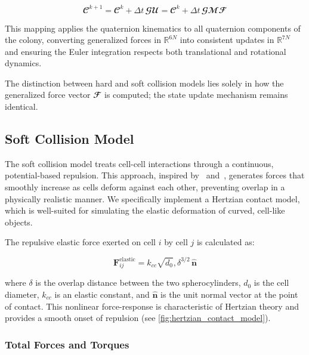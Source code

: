 \documentclass[conference]{IEEEtran}
\begin{document}
\begin{equation} \label{eq:colony_update}
    \mathbfcal{C}^{k+1} = \mathbfcal{C}^k + \Delta t \, \mathbfcal{G} \mathbfcal{U} = \mathbfcal{C}^k + \Delta t \, \mathbfcal{G} \mathbfcal{M} \mathbfcal{F}
\end{equation}

This mapping applies the quaternion kinematics to all quaternion components of the colony, converting generalized forces in $\mathbb{R}^{6N}$ into consistent updates in $\mathbb{R}^{7N}$ and ensuring the Euler integration respects both translational and rotational dynamics.

The distinction between hard and soft collision models lies solely in how the generalized force vector $\mathbfcal{F}$ is computed; the state update mechanism remains identical.

\subsection{Soft Collision Model}

The soft collision model treats cell-cell interactions through a continuous, potential-based repulsion. This approach, inspired by~\cite{Warren2019} and~\cite{You2018}, generates forces that smoothly increase as cells deform against each other, preventing overlap in a physically realistic manner. We specifically implement a Hertzian contact model, which is well-suited for simulating the elastic deformation of curved, cell-like objects.

The repulsive elastic force exerted on cell $i$ by cell $j$ is calculated as:

\begin{equation} \label{eq:hertzian_contact_model}
    \mathbf{F}^{\text{elastic}}_{ij} = k_{cc} \sqrt{d_0} , \delta^{3/2} \, \hat{\mathbf{n}}
\end{equation}

where $\delta$ is the overlap distance between the two spherocylinders, $d_0$ is the cell diameter, $k_{cc}$ is an elastic constant, and $\hat{\mathbf{n}}$ is the unit normal vector at the point of contact. This nonlinear force-response is characteristic of Hertzian theory and provides a smooth onset of repulsion (see \autoref{fig:hertzian_contact_model}).

\subsubsection{Total Forces and Torques}
\end{document}
